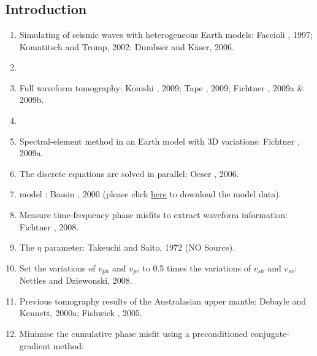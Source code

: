 \renewcommand{\pmk}{Fichtner\_2010\_EPSL\_Full waveform tomography}
\renewcommand{\prf}{FWI/\pmk.pdf}
\renewcommand{\pti}{Full waveform tomography for radially anisotropic structure:
New insights into present and past states of the Australasian upper mantle}
\renewcommand{\pay}{Andreas Fichtner, Brian L. N. Kennett and Heiner Igel \etal, 2010}
\renewcommand{\pjo}{Earth and Planetary Science Letters}
\renewcommand{\pda}{2016/10/13 Thu.}

\section{\pinfo}
\subsection{Introduction}
\begin{enumerate}[\hspace{10mm}*]
  \item Simulating of seismic waves with heterogeneous Earth models: Faccioli \etal, 1997;
    Komatitsch and Tromp, 2002; Dumbser and K\"{a}ser, 2006.
  \item \sline
  \item Full waveform tomography: Konishi \etal, 2009; Tape \etal, 2009;
    Fichtner \etal, 2009a \& 2009b.
  \item \sline
  \item Spectral-element method in an Earth model with 3D variations: Fichtner \etal, 2009a.
  \item The discrete equations are solved in parallel: Oeser \etal, 2006.
  \item {} model
    : Bassin \etal, 2000
    (please click \href{http://igppweb.ucsd.edu/~gabi/crust2.html}{here} to download the model data).
  \item Measure time-frequency phase misfits to extract waveform information: Fichtner \etal, 2008.
  \item The $\eta$ parameter: Takeuchi and Saito, 1972 (NO Source).
  \item Set the variations of $v_{ph}$ and $v_{pv}$ to 0.5 times
    the variations of $v_{sh}$ and $v_{sv}$: Nettles and Dziewonski, 2008.
  \item Previous tomography results of the Australasian upper mantle:
    Debayle and Kennett, 2000a; Fishwick \etal, 2005.
  \item Minimise the cumulative phase misfit using a preconditioned conjugate-gradient method:

\end{enumerate}
